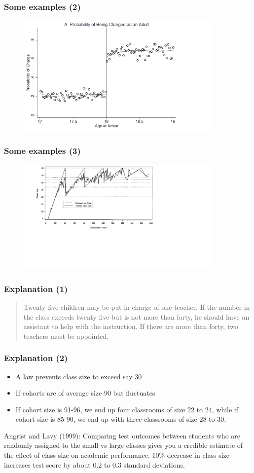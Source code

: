 \documentclass{beamer}
\newcommand{\1}{\mathbb{1}}
\begin{document}
\begin{frame}\frametitle{Some examples (2)}
\begin{figure}
\includegraphics[width = 10cm]{plot/Charged}
\end{figure}
\end{frame}

\begin{frame}\frametitle{Some examples (3)}
\begin{figure}
\includegraphics[width = 10cm]{plot/MaimonidesRule}
\end{figure}
\end{frame}

\begin{frame}\frametitle{Explanation (1)}
\begin{quote}
Twenty five children may be put in charge of one
teacher. If the number in the class exceeds
twenty five but is not more than forty, he should
have an assistant to help with the instruction. If
there are more than forty, two teachers must be
appointed. 
\end{quote}
\end{frame}

\begin{frame}\frametitle{Explanation (2)}
\begin{itemize}
\item A law prevents class size to exceed say 30
\item If cohorts are of average size 90 but fluctuates
\item If cohort size is 91-96, we end up four classrooms of size 22 to 24, while if cohort size is 85-90, we end up with three classrooms of size 28 to 30. 
\end{itemize}
Angrist and Lavy (1999): Comparing test outcomes between students who are randomly assigned to the small vs large classes gives you a credible estimate of the effect of class size on academic performance. 10\% decrease in class size increases test score by about 0.2 to 0.3 standard deviations. 
\end{frame}
\end{document}
